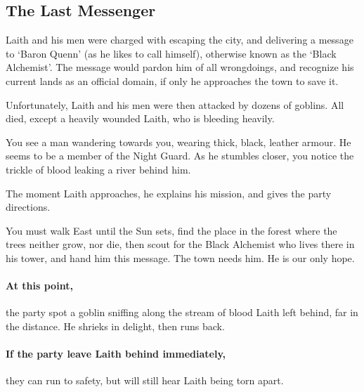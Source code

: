 \begin{multicols}{2}

\subsection{The Last Messenger}

\begin{exampletext}

	Laith and his men were charged with escaping the city, and delivering a message to `Baron Quenn' (as he likes to call himself), otherwise known as the `Black Alchemist'.
	The message would pardon him of all wrongdoings, and recognize his current lands as an official domain, if only he approaches the town to save it.

	Unfortunately, Laith and his men were then attacked by dozens of goblins.
	All died, except a heavily wounded Laith, who is bleeding heavily.

\end{exampletext}

\begin{boxtext}

	You see a man wandering towards you, wearing thick, black, leather armour.
	He seems to be a member of the Night Guard.
	As he stumbles closer, you notice the trickle of blood leaking a river behind him.

\end{boxtext}

The moment Laith approaches, he explains his mission, and gives the party directions.

\begin{speechtext}

	You must walk East until the Sun sets, find the place in the forest where the trees neither grow, nor die, then scout for the Black Alchemist who lives there in his tower, and hand him this message.
	The town needs him.
	He is our only hope.

\end{speechtext}


\paragraph{At this point,}
the party spot a goblin sniffing along the stream of blood Laith left behind, far in the distance.
He shrieks in delight, then runs back.

\paragraph{If the party leave Laith behind immediately,}
they can run to safety, but will still hear Laith being torn apart.


\end{multicols}

